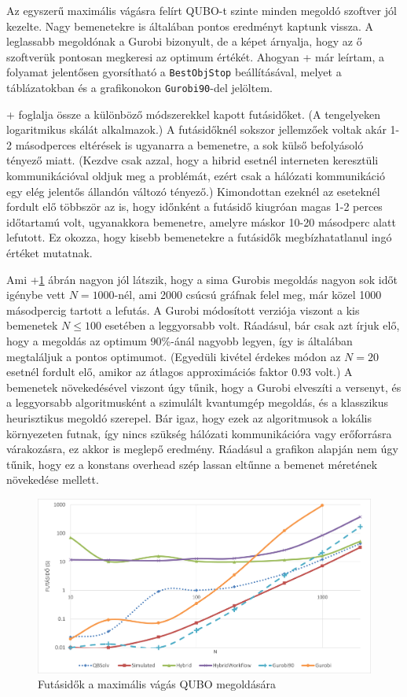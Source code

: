 Az egyszerű maximális vágásra felírt QUBO-t szinte minden megoldó szoftver jól kezelte. Nagy bemenetekre is általában pontos eredményt kaptunk vissza. A leglassabb megoldónak a Gurobi bizonyult, de a képet árnyalja, hogy az ő szoftverük pontosan megkeresi az optimum értékét. Ahogyan \az+ már leírtam, a folyamat jelentősen gyorsítható a \verb+BestObjStop+ beállításával, melyet a táblázatokban és a grafikonokon \verb+Gurobi90+-del jelöltem.

\Az+ foglalja össze a különböző módszerekkel kapott futásidőket. (A tengelyeken logaritmikus skálát alkalmazok.) A futásidőknél sokszor jellemzőek voltak akár 1-2 másodperces eltérések is ugyanarra a bemenetre, a sok külső befolyásoló tényező miatt. (Kezdve csak azzal, hogy a hibrid esetnél interneten keresztüli kommunikációval oldjuk meg a problémát, ezért csak a hálózati kommunikáció egy elég jelentős állandón változó tényező.) Kimondottan ezeknél az eseteknél fordult elő többször az is, hogy időnként a futásidő kiugróan magas 1-2 perces időtartamú volt, ugyanakkora bemenetre, amelyre máskor 10-20 másodperc alatt lefutott. Ez okozza, hogy kisebb bemenetekre a futásidők megbízhatatlanul ingó értéket mutatnak.


Ami \az+\ref{fig:maxCutQUBO} ábrán nagyon jól látszik, hogy a sima Gurobis megoldás nagyon sok időt igénybe vett $N=1000$-nél, ami 2000 csúcsú gráfnak felel meg, már közel 1000 másodpercig tartott a lefutás. A Gurobi módosított verziója viszont a kis bemenetek $N \leq 100$ esetében a leggyorsabb volt. Ráadásul, bár csak azt írjuk elő, hogy a megoldás az optimum 90\%-ánál nagyobb legyen, így is általában megtaláljuk a pontos optimumot. (Egyedüli kivétel érdekes módon az $N=20$ esetnél fordult elő, amikor az átlagos approximációs faktor 0.93 volt.)
A bemenetek növekedésével viszont úgy tűnik, hogy a Gurobi elveszíti a versenyt, és a leggyorsabb algoritmusként a szimulált kvantumgép megoldás, és a klasszikus heurisztikus megoldó szerepel. Bár igaz, hogy ezek az algoritmusok a lokális környezeten futnak, így nincs szükség hálózati kommunikációra vagy erőforrásra várakozásra, ez akkor is meglepő eredmény. Ráadásul a grafikon alapján nem úgy tűnik, hogy ez a konstans overhead szép lassan eltűnne a bemenet méretének növekedése mellett.


\begin{figure}[!ht]
	\centering
	\includegraphics[width=150mm, keepaspectratio]{figures/diagrams/maxCutQUBO.png}
	\caption{Futásidők a maximális vágás QUBO megoldására}
	\label{fig:maxCutQUBO}
\end{figure}

